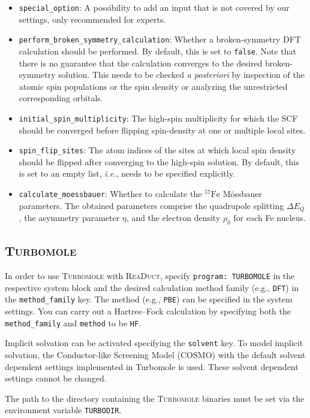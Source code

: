 \documentclass[]{tufte-book}
\begin{document}
\begin{itemize}
\item \texttt{special\_option}: A possibility to add an input that is not covered by our settings, only recommended for experts.
\item \texttt{perform\_broken\_symmetry\_calculation}: Whether a broken-symmetry DFT calculation should be performed. By default, this is set to \texttt{false}. Note that there is no guarantee that the calculation converges to the desired broken-symmetry solution. This needs to be checked \textit{a posteriori} by inspection of the atomic spin populations or the spin density or analyzing the unrestricted corresponding orbitals.
\item \texttt{initial\_spin\_multiplicity}: The high-spin multiplicity for which the SCF should be converged before flipping spin-density at one or multiple local sites.
\item \texttt{spin\_flip\_sites}: The atom indices of the sites at which local spin density should be flipped after converging to the high-spin solution. By default, this is set to an empty list, \textit{i.e.}, needs to be specified explicitly.
\item \texttt{calculate\_moessbauer}: Whether to calculate the $\mathrm{^{57}Fe}$ M\"ossbauer parameters. The obtained parameters comprise the quadrupole splitting $\Delta E_Q$, the asymmetry parameter $\eta$, and the electron density $\rho_0$ for each Fe nucleus.
\end{itemize}

\subsection{\textsc{Turbomole}}

In order to use \textsc{Turbomole} with \textsc{ReaDuct}, specify \texttt{program: TURBOMOLE} in the respective system block and the desired
calculation method family (e.g., \texttt{DFT}) in the \texttt{method\_family} key.
The method (e.g., \texttt{PBE}) can be specified in the system settings.
You can carry out a Hartree--Fock calculation by specifying both the \texttt{method\_family} and \texttt{method} to be \texttt{HF}.

Implicit solvation can be activated specifying the \texttt{solvent} key.
To model implicit solvation, the Conductor-like Screening Model \cite{cosmo} (COSMO) with the default solvent dependent settings implemented in Turbomole is used.
These solvent dependent settings cannot be changed.

The path to the directory containing the \textsc{Turbomole} binaries must be set via the environment variable \texttt{TURBODIR}.
\end{document}

